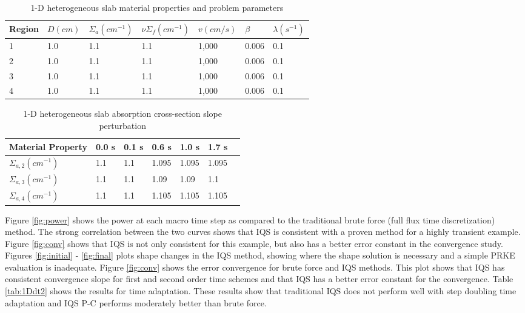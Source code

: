 \documentclass[12pt]{scrartcl}
\begin{document}
\begin{table}[!htbp]
\begin{center}
\caption{1-D heterogeneous slab material properties and problem parameters}
\label{tab:1Dmat}
\begin{tabular}{lllllll}
\hline
Region & $D (cm)$ & $\Sigma_a (cm^{-1})$ & $\nu \Sigma_f (cm^{-1})$ & $v (cm/s)$ & $\beta$ & $\lambda (s^{-1})$ \\
\hline
1 & 1.0 & 1.1 & 1.1 & 1,000 & 0.006 & 0.1 \\
2 & 1.0 & 1.1 & 1.1 & 1,000 & 0.006 & 0.1 \\
3 & 1.0 & 1.1 & 1.1 & 1,000 & 0.006 & 0.1 \\
4 & 1.0 & 1.1 & 1.1 & 1,000 & 0.006 & 0.1 \\
\hline
\end{tabular}
\end{center}
\end{table}

\begin{table}[!htbp]
\begin{center}
\caption{1-D heterogeneous slab absorption cross-section slope perturbation}
\label{tab:1Dslope}
\begin{tabular}{lllllll}
\hline
Material Property & 0.0 s & 0.1 s & 0.6 s & 1.0 s & 1.7 s \\
\hline
$\Sigma_{a,2} (cm^{-1})$ & 1.1 & 1.1 & 1.095 & 1.095 & 1.095 \\
$\Sigma_{a,3} (cm^{-1})$ & 1.1 & 1.1 & 1.09 & 1.09 & 1.1 \\
$\Sigma_{a,4} (cm^{-1})$ & 1.1 & 1.1 & 1.105 & 1.105 & 1.105 \\
\hline
\end{tabular}
\end{center}
\end{table}



Figure \ref{fig:power} shows the power at each macro time step as compared to the traditional brute force (full flux time discretization) method.  The strong correlation between the two curves shows that IQS is consistent with a proven method for a highly transient example.  Figure \ref{fig:conv} shows that IQS is not only consistent for this example, but also has a better error constant in the convergence study.  Figures \ref{fig:initial} - \ref{fig:final} plots shape changes in the IQS method, showing where the shape solution is necessary and a simple PRKE evaluation is inadequate.  Figure \ref{fig:conv} shows the error convergence for brute force and IQS methods.  This plot shows that IQS has consistent convergence slope for first and second order time schemes and that IQS has a better error constant for the convergence.  Table \ref{tab:1Ddt2} shows the results for time adaptation.  These results show that traditional IQS does not perform well with step doubling time adaptation and IQS P-C performs moderately better than brute force.
\end{document}
